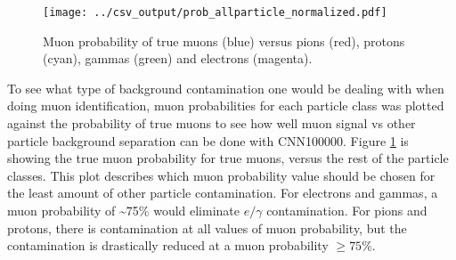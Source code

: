\begin{figure}[htp]
\centering
\texttt{[image: ../csv\_output/prob\_allparticle\_normalized.pdf]}
\caption{Muon probability of true muons (blue) versus pions (red), protons (cyan), gammas (green) and electrons (magenta).}
\label{fig:prob}
\end{figure}
To see what type of background contamination one would be dealing with when doing muon identification, muon probabilities for each particle class was plotted against the probability of true muons to see how well muon signal vs other particle background separation can be done with CNN100000. Figure \ref{fig:prob} is showing the true muon probability for true muons, versus the rest of the particle classes. This plot describes which muon probability value should be chosen for the least amount of other particle contamination. For electrons and gammas, a muon probability of \sim 75\% would eliminate $e/\gamma$ contamination. For pions and protons, there is contamination at all values of muon probability, but the contamination is drastically reduced at a muon probability $\geq 75\%$.
 

